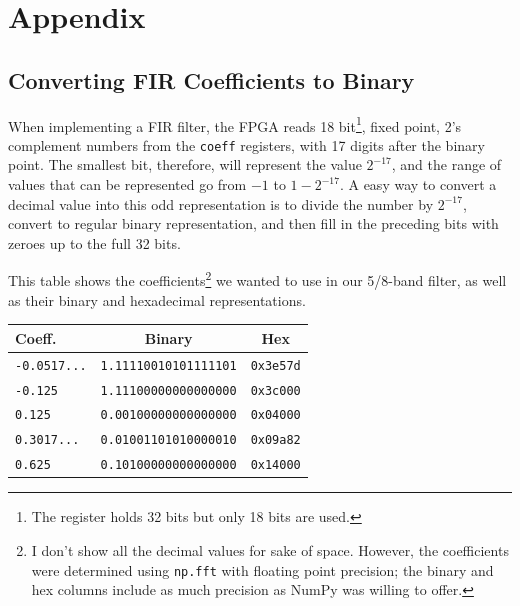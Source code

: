 \documentclass[12pt]{article}
\begin{document}
\section{Appendix}
\subsection{Converting FIR Coefficients to Binary}
When implementing a FIR filter, the FPGA reads 18 bit\footnote{The register holds 32 bits but only 18 bits are used.}, fixed point, 2's complement numbers from the \texttt{coeff} registers, with 17 digits after the binary point. The smallest bit, therefore, will represent the value $2^{-17}$, and the range of values that can be represented go from $-1$ to $1-2^{-17}$. A easy way to convert a decimal value into this odd representation is to divide the number by $2^{-17}$, convert to regular binary representation, and then fill in the preceding bits with zeroes up to the full 32 bits.

This table shows the coefficients\footnote{I don't show all the decimal values for sake of space. However, the coefficients were determined using \texttt{np.fft} with floating point precision; the binary and hex columns include as much precision as NumPy was willing to offer.} we wanted to use in our 5/8-band filter, as well as their binary and hexadecimal representations.

\begin{center}
  \begin{tabular}{ l | c | c }
    Coeff. & Binary & Hex\\ \hline
    \texttt{-0.0517...}  &  \texttt{1.11110010101111101} & \texttt{0x3e57d}\\
    \texttt{-0.125} &  \texttt{1.11100000000000000} & \texttt{0x3c000}\\
    \texttt{0.125} & \texttt{0.00100000000000000} & \texttt{0x04000}\\
    \texttt{0.3017...} &  \texttt{0.01001101010000010} & \texttt{0x09a82}\\
    \texttt{0.625} &  \texttt{0.10100000000000000} & \texttt{0x14000}\\
   \end{tabular}
\end{center}
\end{document}
